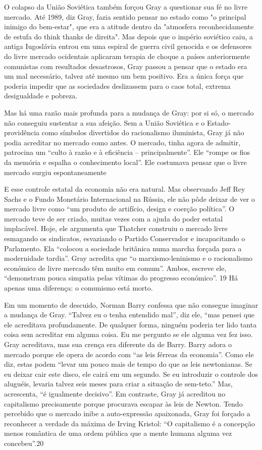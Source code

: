  \par 
O colapso da União Soviética também forçou Gray a questionar sua fé no livre mercado. Até 1989, diz Gray, fazia sentido pensar no estado como "o principal inimigo do bem-estar", que era a atitude dentro da "atmosfera reconhecidamente de estufa do think thanks de direita". Mas depois que o império soviético caiu, a antiga Iugoslávia entrou em uma espiral de guerra civil genocida e os defensores do livre mercado ocidentais aplicaram terapia de choque a países anteriormente comunistas com resultados desastrosos, Gray passou a pensar que o estado era um mal necessário, talvez até mesmo um bem positivo. Era a única força que poderia impedir que as sociedades deslizassem para o caos total, extrema desigualdade e pobreza.
 \par 
Mas há uma razão mais profunda para a mudança de Gray: por si só, o mercado não conseguiu sustentar a sua afeição. Sem a União Soviética e o Estado-providência como símbolos divertidos do racionalismo iluminista, Gray já não podia acreditar no mercado como antes. O mercado, tinha agora de admitir, patrocina um “culto à razão e à eficiência – principalmente”. Ele “rompe os fios da memória e espalha o conhecimento local”. Ele costumava pensar que o livre mercado surgiu espontaneamente
 \par 
E esse controle estatal da economia não era natural. Mas observando Jeff Rey Sachs e o Fundo Monetário Internacional na Rússia, ele não pôde deixar de ver o mercado livre como “um produto de artifício, design e coerção política”. O mercado teve de ser criado, muitas vezes com a ajuda do poder estatal implacável. Hoje, ele argumenta que Thatcher construiu o mercado livre esmagando os sindicatos, esvaziando o Partido Conservador e incapacitando o Parlamento. Ela “colocou a sociedade britânica numa marcha forçada para a modernidade tardia”. Gray acredita que “o marxismo-leninismo e o racionalismo económico de livre mercado têm muito em comum”. Ambos, escreve ele, “demonstram pouca simpatia pelas vítimas do progresso económico”. {\color{blue}19} Há apenas uma diferença: o comunismo está morto.
 \par 
Em um momento de descuido, Norman Barry confessa que não consegue imaginar a mudança de Gray. “Talvez eu o tenha entendido mal”, diz ele, “mas pensei que ele acreditava profundamente. De qualquer forma, ninguém poderia ter lido tanta coisa sem acreditar em alguma coisa. Eu me pergunto se ele alguma vez fez isso. Gray acreditava, mas sua crença era diferente da de Barry. Barry adora o mercado porque ele opera de acordo com “as leis férreas da economia”. Como ele diz, estas podem “levar um pouco mais de tempo do que as leis newtonianas. Se eu deixar cair este disco, ele cairá em um segundo. Se eu introduzir o controle dos aluguéis, levaria talvez seis meses para criar a situação de sem-teto.” Mas, acrescenta, “é igualmente decisivo”. Em contraste, Gray já acreditou no capitalismo precisamente porque procurava escapar às leis de Newton. Tendo percebido que o mercado inibe a auto-expressão apaixonada, Gray foi forçado a reconhecer a verdade da máxima de Irving Kristol: “O capitalismo é a concepção menos romântica de uma ordem pública que a mente humana alguma vez concebeu”.{\color{blue}20}
